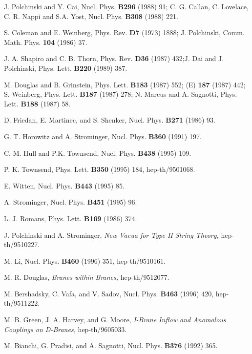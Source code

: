 \begin{thebibliography}{99}
J. Polchinski and Y. Cai, Nucl. Phys. {\bf B296} (1988) 91;\hfil\break 
C. G. Callan, C. Lovelace, C. R. Nappi and S.A. Yost,
Nucl. Phys. {\bf B308} (1988) 221.

S. Coleman and E. Weinberg, Phys. Rev. {\bf D7}
(1973) 1888;\hfil\break 
J. Polchinski, Comm. Math. Phys. {\bf 104}
(1986) 37.

J. A. Shapiro and C. B. Thorn, Phys.
Rev. {\bf D36} (1987) 432;\hfil\break J. Dai and J. Polchinski, Phys. Lett.
{\bf B220} (1989) 387.


M. Douglas and B. Grinstein, Phys. Lett. {\bf B183} (1987) 552; (E) {\bf 187}
(1987) 442;\hfil\break 
S. Weinberg, Phys. Lett. {\bf B187} (1987) 278;\hfil\break
N. Marcus and A. Sagnotti, Phys. Lett. {\bf B188} (1987) 58.

D. Friedan, E. Martinec, and S. Shenker, Nucl. Phys. {\bf B271}
(1986) 93.

G. T. Horowitz and A. Strominger,
Nucl. Phys. {\bf B360} (1991) 197.

C. M. Hull and P.K. Townsend,
Nucl. Phys. {\bf B438} (1995) 109.

P. K. Townsend, Phys. Lett. {\bf B350} (1995) 184, 
hep-th/9501068.

E. Witten, Nucl. Phys. {\bf B443} (1995) 85.

A. Strominger, Nucl. Phys. {\bf B451} (1995) 96.

L. J. Romans, Phys. Lett. {\bf B169} (1986) 374.

J. Polchinski and A. Strominger, {\it New Vacua for Type II String Theory,}
hep-th/9510227.

M. Li, Nucl. Phys. {\bf B460} (1996) 351, hep-th/9510161.

M. R. Douglas, {\it Branes within Branes,} hep-th/9512077.

M. Bershadsky, C. Vafa, and V. Sadov, Nucl. Phys. {\bf B463}
(1996) 420, hep-th/9511222.

M. B. Green, J. A. Harvey, and
G. Moore, {\it I-Brane Inflow and Anomalous Couplings on
D-Branes,} hep-th/9605033.

M. Bianchi, G. Pradisi, and A. Sagnotti, Nucl. Phys. {\bf B376} (1992)
365.


\end{thebibliography}
